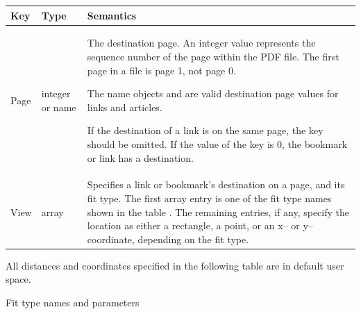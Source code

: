 \documentclass[letterpaper,12pt,english,openany,oneside]{sphinxmanual}
\begin{document}
\begin{savenotes}\sphinxattablestart
\centering
{}\label{\detokenize{pdfmark_Actions:section-3}}\nobreak
\begin{tabulary}{\linewidth}[t]{|T|T|T|}
\hline
\sphinxstyletheadfamily 
Key
&\sphinxstyletheadfamily 
Type
&\sphinxstyletheadfamily 
Semantics
\\
\hline
Page
&
integer or name
&
The destination page. An integer value represents the sequence number of the page within the PDF file. The first page in a file is page 1, not page 0.

The name objects  and  are valid destination page values for links and articles.

If the destination of a link is on the same page, the  key should be omitted. If the value of the  key is 0, the bookmark or link has a  destination.
\\
\hline
View
&
array
&
Specifies a link or bookmark’s destination on a page, and its fit type. The first array entry is one of the fit type names shown in the table . The remaining entries, if any, specify the location as either a rectangle, a point, or an x– or y–coordinate, depending on the fit type.
\\
\hline
\end{tabulary}
\par
\sphinxattableend\end{savenotes}

All distances and coordinates specified in the following table are in default user space.

Fit type names and parameters
\end{document}
